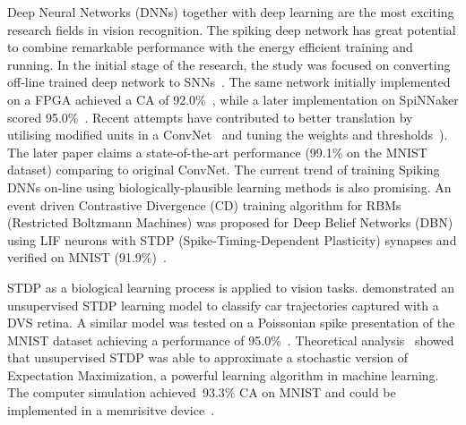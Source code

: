 \documentclass[journal]{journal}
\begin{document}
	Deep Neural Networks (DNNs) together with deep learning are the most exciting research fields in vision recognition.
	The spiking deep network has great potential to combine remarkable performance with the energy efficient training and running.
	In the initial stage of the research, the study was focused on converting off-line trained deep network to SNNs~\cite{o2013real}.
	The same network initially implemented on a FPGA achieved a CA of 92.0\%~\cite{neil2014minitaur}, while a later implementation on SpiNNaker scored 95.0\%~\cite{Stromatias2015scalable}.
	Recent attempts have contributed to better translation by utilising modified units in a ConvNet~\cite{cao2015spiking} and tuning the weights and thresholds~\cite{Diehl2015fast}).
	The later paper claims a state-of-the-art performance (99.1\% on the MNIST dataset) comparing to original ConvNet.
	The current trend of training Spiking DNNs on-line using biologically-plausible learning methods is also promising.
	An event driven Contrastive Divergence (CD) training algorithm for RBMs (Restricted Boltzmann Machines) was proposed for Deep Belief Networks (DBN) using LIF neurons with STDP (Spike-Timing-Dependent Plasticity) synapses and verified on MNIST (91.9\%)~\cite{neftci2013event}.
	
	STDP as a biological learning process is applied to vision tasks.
	\cite{bichler2012extraction} demonstrated an unsupervised STDP learning model to classify car trajectories captured with a DVS retina. 
	A similar model was tested on a Poissonian spike presentation of the MNIST dataset achieving a performance of 95.0\%~\cite{diehl2015unsupervised}.
	Theoretical analysis~\cite{nessler2013bayesian} showed that unsupervised STDP was able to approximate a stochastic version of Expectation Maximization, a powerful learning algorithm in machine learning.
	The computer simulation achieved~93.3\% CA on MNIST and could be implemented in a memrisitve device~\cite{bill2014compound}. 
	
\end{document}
